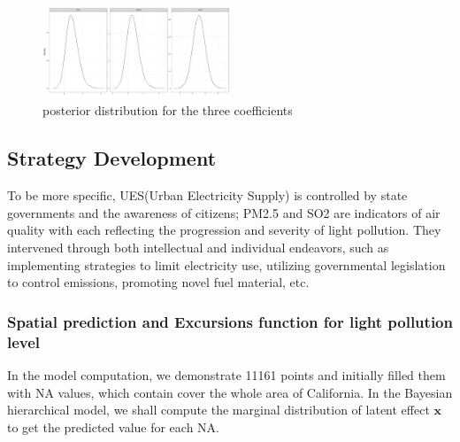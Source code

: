 \documentclass{mcmthesis}
\begin{document}
\begin{figure}[htp]
    \centering
    \includegraphics[width=0.5\textwidth]{images/posterior.png}
    \caption{posterior distribution for the three coefficients}
    \label{pre1}
\end{figure}

\subsection{Strategy Development}
To be more specific, UES(Urban Electricity Supply) is controlled by state governments and the awareness of citizens; PM2.5 and SO2 are indicators of air quality with each reflecting the progression and severity of light pollution. They intervened through both intellectual and individual endeavors, such as implementing strategies to limit electricity use, utilizing governmental legislation to control emissions, promoting novel fuel material, etc.


\subsubsection{Spatial prediction and Excursions function for light pollution level}

In the model computation, we demonstrate 11161 points and initially filled them with NA values, which contain cover the whole area of California. In the Bayesian hierarchical model, we shall compute the marginal distribution of latent effect $\boldsymbol{x}$ to get the predicted value for each NA. 
\end{document}
